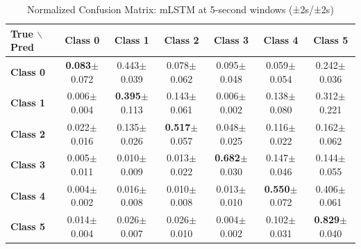 \begin{table}[htbp]
\centering
\caption{Normalized Confusion Matrix: mLSTM at 5-second windows (±2s/±2s)}
\label{tab:app_cm_mlstm_5s}
\small
\setlength{\tabcolsep}{2pt}
\begin{tabular}{lcccccc}
	\toprule
	\textbf{True $\backslash$ Pred} & \textbf{Class 0} & \textbf{Class 1} & \textbf{Class 2} & \textbf{Class 3} & \textbf{Class 4} & \textbf{Class 5} \\
\midrule
	\textbf{Class 0} & \textbf{0.083}$\pm$0.072 & 0.443$\pm$0.039 & 0.078$\pm$0.062 & 0.095$\pm$0.048 & 0.059$\pm$0.054 & 0.242$\pm$0.036 \\
	\textbf{Class 1} & 0.006$\pm$0.004 & \textbf{0.395}$\pm$0.113 & 0.143$\pm$0.061 & 0.006$\pm$0.002 & 0.138$\pm$0.080 & 0.312$\pm$0.221 \\
	\textbf{Class 2} & 0.022$\pm$0.016 & 0.135$\pm$0.026 & \textbf{0.517}$\pm$0.057 & 0.048$\pm$0.025 & 0.116$\pm$0.022 & 0.162$\pm$0.062 \\
	\textbf{Class 3} & 0.005$\pm$0.011 & 0.010$\pm$0.009 & 0.013$\pm$0.022 & \textbf{0.682}$\pm$0.030 & 0.147$\pm$0.046 & 0.144$\pm$0.055 \\
	\textbf{Class 4} & 0.004$\pm$0.002 & 0.016$\pm$0.008 & 0.010$\pm$0.008 & 0.013$\pm$0.010 & \textbf{0.550}$\pm$0.072 & 0.406$\pm$0.061 \\
	\textbf{Class 5} & 0.014$\pm$0.004 & 0.026$\pm$0.007 & 0.026$\pm$0.010 & 0.004$\pm$0.002 & 0.102$\pm$0.031 & \textbf{0.829}$\pm$0.040 \\
\bottomrule
\end{tabular}
\setlength{\tabcolsep}{6pt}
\end{table}

